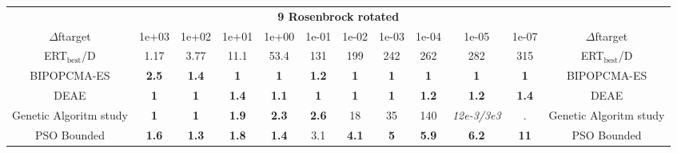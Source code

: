 \begin{tabular}{cccccccccccc}
 & \multicolumn{10}{c}{{\normalsize \textbf{9 Rosenbrock rotated}}}\\
$\Delta$ftarget& 1e+03& 1e+02& 1e+01& 1e+00& 1e-01& 1e-02& 1e-03& 1e-04& 1e-05& 1e-07 & $\Delta$ftarget \\
ERT$_{\textrm{best}}$/D& 1.17& 3.77& 11.1& 53.4& 131& 199& 242& 262& 282& 315 & ERT$_{\textrm{best}}$/D \\
\hline
BIPOPCMA-ES & \textbf{2.5} & \textbf{1.4} & \textbf{1} & \textbf{1} & \textbf{1.2} & \textbf{1} & \textbf{1} & \textbf{1} & \textbf{1} & \textbf{1} & BIPOPCMA-ES \cite{add_an_entry_for_BIPOPCMA-ES_in_bbob.bib}\\
DEAE & \textbf{1} & \textbf{1} & \textbf{1.4} & \textbf{1.1} & \textbf{1} & \textbf{1} & \textbf{1} & \textbf{1.2} & \textbf{1.2} & \textbf{1.4} & DEAE \cite{add_an_entry_for_DEAE_in_bbob.bib}\\
Genetic Algoritm study & \textbf{1} & \textbf{1} & \textbf{1.9} & \textbf{2.3} & \textbf{2.6} & 18 & 35 & 140 & \textit{12e-3}\textit{/3e3} & . & Genetic Algoritm study \cite{add_an_entry_for_Genetic Algoritm study_in_bbob.bib}\\
PSO Bounded & \textbf{1.6} & \textbf{1.3} & \textbf{1.8} & \textbf{1.4} & 3.1 & \textbf{4.1} & \textbf{5} & \textbf{5.9} & \textbf{6.2} & \textbf{11} & PSO Bounded \cite{add_an_entry_for_PSO Bounded_in_bbob.bib}
\end{tabular}
